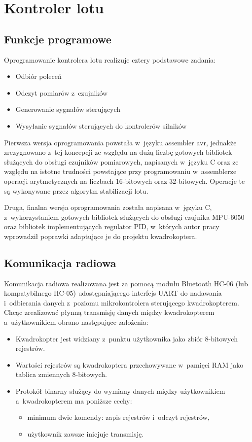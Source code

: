 \section{Kontroler lotu}

\subsection{Funkcje programowe}

Oprogramowanie kontrolera lotu realizuje cztery podstawowe zadania:

\begin{itemize}
	\item Odbiór poleceń 
	\item Odczyt pomiarów z~czujników
	\item Generowanie sygnałów sterujących 
	\item Wysyłanie sygnałów sterujących do kontrolerów silników
\end{itemize}

Pierwsza wersja oprogramowania powstała w~języku assembler avr, jednakże zrezygnowano z~tej koncepcji ze względu na dużą liczbę gotowych bibliotek służących do obsługi czujników pomiarowych, napisanych w~języku C oraz ze względu na istotne trudności powstające przy programowaniu w~assemblerze operacji arytmetycznych na liczbach 16-bitowych oraz 32-bitowych. Operacje te są wykonywane przez algorytm stabilizacji lotu. 

Druga, finalna wersja oprogramowania została napisana w~języku C, z~wykorzystaniem gotowych bibliotek służących do obsługi czujnika MPU-6050 oraz bibliotek implementujących regulator PID, w~których autor pracy wprowadził poprawki adaptujące je do projektu kwadrokoptera.


\subsection{Komunikacja radiowa}

Komunikacja radiowa realizowana jest za pomocą modułu Bluetooth HC-06 (lub kompatybilnego HC-05) udostępniającego interfejs UART do nadawania i~odbierania danych z~poziomu mikrokontrolera sterującego kwadrokopterem.
Chcąc zrealizować płynną transmisję danych między kwadrokopterem a~użytkownikiem obrano następujące założenia:
\begin{itemize}
	\item Kwadrokopter jest widziany z~punktu użytkownika jako zbiór 8-bitowych rejestrów.
	\item Wartości rejestrów są kwadrokoptera przechowywane w~pamięci RAM jako tablica zmiennych 8-bitowych.
	\item Protokół binarny służący do wymiany danych między użytkownikiem a~kwadrokopterem ma poniższe cechy:
	\begin{itemize}
		\item minimum dwie komendy: zapis rejestrów i~odczyt rejestrów,
		\item użytkownik zawsze inicjuje transmisję.
	\end{itemize} 
\end{itemize}

